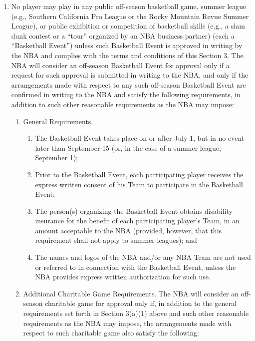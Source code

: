 \documentclass[
]{book}
\providecommand{\tightlist}{%
  \setlength{\itemsep}{0pt}\setlength{\parskip}{0pt}}
\begin{document}
\begin{enumerate}
\def\labelenumi{(\alph{enumi})}
\tightlist
\item
  No player may play in any public off-season basketball game, summer league (e.g., Southern California Pro League or the Rocky Mountain Revue Summer League), or public exhibition or competition of basketball skills (e.g., a slam dunk contest or a ``tour'' organized by an NBA business partner) (each a ``Basketball Event'') unless such Basketball Event is approved in writing by the NBA and complies with the terms and conditions of this Section 3. The NBA will consider an off-season Basketball Event for approval only if a request for such approval is submitted in writing to the NBA, and only if the arrangements made with respect to any such off-season Basketball Event are confirmed in writing to the NBA and satisfy the following requirements, in addition to such other reasonable requirements as the NBA may impose:

  \begin{enumerate}
  \def\labelenumii{(\arabic{enumii})}
  \tightlist
  \item
    General Requirements.

    \begin{enumerate}
    \def\labelenumiii{(\roman{enumiii})}
    \tightlist
    \item
      The Basketball Event takes place on or after July 1, but in no event later than September 15 (or, in the case of a summer league, September 1);
    \item
      Prior to the Basketball Event, each participating player receives the express written consent of his Team to participate in the Basketball Event;
    \item
      The person(s) organizing the Basketball Event obtains disability insurance for the benefit of each participating player's Team, in an amount acceptable to the NBA (provided, however, that this requirement shall not apply to summer leagues); and
    \item
      The names and logos of the NBA and/or any NBA Team are not used or referred to in connection with the Basketball Event, unless the NBA provides express written authorization for such use.
    \end{enumerate}
  \item
    Additional Charitable Game Requirements. The NBA will consider an off-season charitable game for approval only if, in addition to the general requirements set forth in Section 3(a)(1) above and such other reasonable requirements as the NBA may impose, the arrangements made with respect to such charitable game also satisfy the following:


\end{enumerate}
\end{enumerate}
\end{document}
